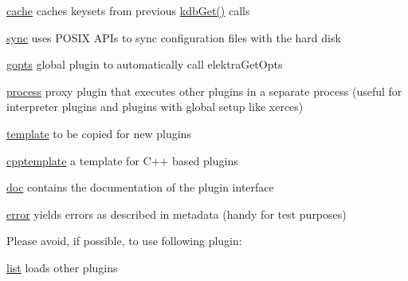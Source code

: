 \begin{DoxyItemize}
\item \hyperlink{autotoc_md70_src_plugins_cache_README_md}{cache} caches keysets from previous {\ttfamily \hyperlink{group__kdb_ga28e385fd9cb7ccfe0b2f1ed2f62453a1}{kdb\+Get()}} calls
\item \hyperlink{autotoc_md624_src_plugins_sync_README_md}{sync} uses P\+O\+S\+IX A\+P\+Is to sync configuration files with the hard disk
\item \hyperlink{autotoc_md241_src_plugins_gopts_README_md}{gopts} global plugin to automatically call {\ttfamily elektra\+Get\+Opts}
\item \hyperlink{autotoc_md495_src_plugins_process_README_md}{process} proxy plugin that executes other plugins in a separate process (useful for interpreter plugins and plugins with global setup like {\ttfamily xerces})
\end{DoxyItemize}


\begin{DoxyItemize}
\item \hyperlink{autotoc_md627_src_plugins_template_README_md}{template} to be copied for new plugins
\item \hyperlink{autotoc_md106_src_plugins_cpptemplate_README_md}{cpptemplate} a template for C++ based plugins
\item \hyperlink{autotoc_md189_src_plugins_doc_README_md}{doc} contains the documentation of the plugin interface
\item \hyperlink{autotoc_md196_src_plugins_error_README_md}{error} yields errors as described in metadata (handy for test purposes)
\end{DoxyItemize}

Please avoid, if possible, to use following plugin\+:


\begin{DoxyItemize}
\item \hyperlink{autotoc_md353_src_plugins_list_README_md}{list} loads other plugins 
\end{DoxyItemize}
